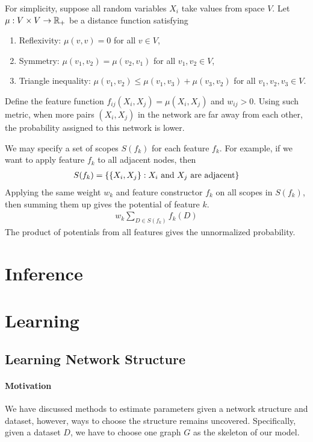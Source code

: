 \documentclass[11pt]{article}
\begin{document}
	\begin{example}
		For simplicity, suppose all random variables $X_i$ take values from space $V$.
		Let $\mu: V \times V \to \mathbb{R}_+$ be a distance function satisfying
		\begin{enumerate}
			\item Reflexivity: $\mu(v, v) = 0$ for all $v \in V$,
			\item Symmetry: $\mu(v_1, v_2) = \mu(v_2, v_1)$ for all $v_1, v_2 \in V$,
			\item Triangle inequality: $\mu(v_1, v_2) \leq \mu(v_1, v_3) + \mu(v_3, v_2)$ for all $v_1, v_2, v_3 \in V$.
		\end{enumerate}
		Define the feature function $f_{ij}(X_i, X_j) = \mu(X_i, X_j)$ and $w_{ij} > 0$.
		Using such metric, when more pairs $(X_i, X_j)$ in the network are far away from each other, the probability assigned to this network is lower.
	\end{example}
	
	\begin{example}
		We may specify a set of scopes $S(f_k)$ for each feature $f_k$.
		For example, if we want to apply feature $f_k$ to all adjacent nodes, then
		\begin{align}
			S(f_k) = \{\{X_i, X_j\}: X_i\text{{ and }}X_j \text{{ are adjacent}} \}
		\end{align}
		Applying the same weight $w_k$ and feature constructor $f_k$ on all scopes in $S(f_k)$, then summing them up gives the potential of feature $k$.
		\begin{align}
			w_k \sum_{D \in S(f_k)} f_k(D)
		\end{align}
		The product of potentials from all features gives the unnormalized probability.
	\end{example}

	\section{Inference}
	\section{Learning}
	\subsection{Learning Network Structure}
	\paragraph{Motivation} We have discussed methods to estimate parameters given a network structure and dataset, however, ways to choose the structure remains uncovered.
	Specifically, given a dataset $D$, we have to choose one graph $G$ as the skeleton of our model.
\end{document}
